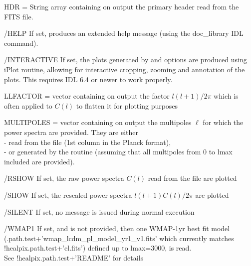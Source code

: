 \begin{keywords}
  \begin{kwlist}{} %
    \item[HDR =] %
	String array containing on output the primary header
      read from the FITS file. 
    \item[/HELP] %
	If set, produces an extended help message (using the doc\_library
    IDL command). 
    \item[/INTERACTIVE] %
	If set, the plots generated by  and  options are produced using iPlot routine, allowing 
           for interactive cropping, zooming and annotation of the plots. This
           requires IDL 6.4 or newer to work properly.
    \item[LLFACTOR =] %
	vector containing on output the factor $l(l+1)/2\pi$ which is often
          applied to $C(l)$ to flatten it for plotting purposes
    \item[MULTIPOLES =] %
	vector containing on output the multipoles
    $\ell$ for which the power spectra are provided. They are either\\
           - read from the file (1st column in the Planck format),\\
          - or generated by the routine (assuming that all
               multipoles from 0 to lmax included are provided).
    \item[/RSHOW] %
	If set, the raw power spectra $C(l)$ read from the file are plotted
    \item[/SHOW] %
	If set, the rescaled power spectra $l(l+1)C(l)/2\pi$ are plotted
    \item[/SILENT] %
	If set, no message is issued during normal execution
%
    \item[/WMAP1] %
           If set, and  
           is not provided, then one WMAP-1yr best fit
          model
(.path.test+\-'wmap\_lcdm\_pl\_model\_yr1\_v1.fits'
which currently matches !healpix.path.test+'cl.fits') 
          defined up to lmax=3000, is read.\\
          See !healpix.path.test+'README' for details

\end{kwlist}
\end{keywords}
